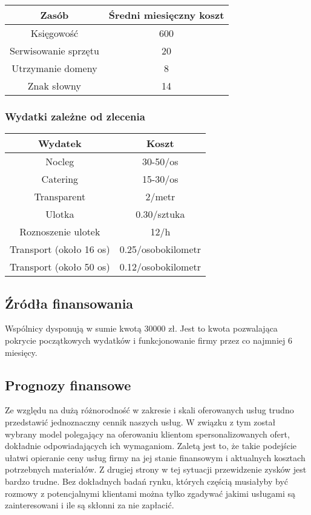 \documentclass{article}
\begin{document}
\begin{table}[H]
\label{table2}
\vspace{0.3cm}
\hspace{-2cm}
\centering
\begin{tabular}{|c|c|}
\hline
Zasób & Średni miesięczny koszt \\
\hline
Księgowość & 600 \\
Serwisowanie sprzętu & 20 \\
Utrzymanie domeny & 8 \\
Znak słowny & 14 \\
\hline
\end{tabular}
\end{table}

\subsubsection{Wydatki zależne od zlecenia}
\begin{table}[H]
\label{table2}
\vspace{0.3cm}
\hspace{-2cm}
\centering
\begin{tabular}{|c|c|}
\hline
Wydatek & Koszt \\
\hline
Nocleg & 30-50/os \\
Catering & 15-30/os \\
Transparent & 2/metr \\
Ulotka & 0.30/sztuka \\
Roznoszenie ulotek & 12/h \\
Transport (około 16 os) & 0.25/osobokilometr \\
Transport (około 50 os) & 0.12/osobokilometr \\
\hline
\end{tabular}
\end{table}

\subsection{Źródła finansowania}
Wspólnicy dysponują w sumie kwotą 30000 zł. Jest to kwota pozwalająca pokrycie początkowych wydatków i funkcjonowanie firmy przez co najmniej 6 miesięcy.

\subsection{Prognozy finansowe}
Ze względu na dużą różnorodność w zakresie i skali oferowanych usług trudno przedstawić jednoznaczny cennik naszych usług. W związku z tym został wybrany model polegający na oferowaniu klientom spersonalizowanych ofert, dokładnie odpowiadających ich wymaganiom. Zaletą jest to, że takie podejście ułatwi opieranie ceny usług firmy na jej stanie finansowym i aktualnych kosztach potrzebnych materiałów. Z drugiej strony w tej sytuacji przewidzenie zysków jest bardzo trudne. Bez dokładnych badań rynku, których częścią musiałyby być rozmowy z potencjalnymi klientami można tylko zgadywać jakimi usługami są zainteresowani i ile są skłonni za nie zapłacić.
\end{document}
